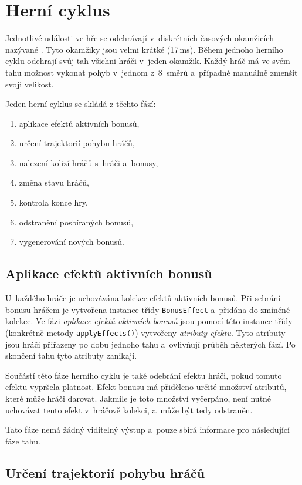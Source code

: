 \section{Herní cyklus}
\label{sec:herni-cyklus}

Jednotlivé události ve hře se odehrávají v~diskrétních časových okamžicích nazývané . Tyto okamžiky jsou velmi krátké (17\,ms). Během jednoho herního cyklu odehrají svůj tah všichni hráči v~jeden okamžik. Každý hráč má ve svém tahu možnost vykonat pohyb v~jednom z~8~směrů a~případně manuálně zmenšit svoji velikost.

Jeden herní cyklus se skládá z těchto fází:
\begin{enumerate}
    \item aplikace efektů aktivních bonusů,
    \item určení trajektorií pohybu hráčů,
    \item nalezení kolizí hráčů s~hráči a~bonusy,
    \item změna stavu hráčů,
    \item kontrola konce hry,
    \item odstranění posbíraných bonusů,
    \item vygenerování nových bonusů.
\end{enumerate}

\subsection*{Aplikace efektů aktivních bonusů}

U~každého hráče je uchovávána kolekce efektů aktivních bonusů. Při sebrání bonusu hráčem je vytvořena instance třídy \texttt{BonusEffect} a~přidána do zmíněné kolekce. Ve fázi \emph{aplikace efektů aktivních bonusů} jsou pomocí této instance třídy (konkrétně metody \texttt{applyEffects()}) vytvořeny \emph{atributy efektu}. Tyto atributy jsou hráči přiřazeny po dobu jednoho tahu a~ovlivňují průběh některých fází. Po skončení tahu tyto atributy zanikají.

Součástí této fáze herního cyklu je také odebrání efektu hráči, pokud tomuto efektu vypršela platnost. Efekt bonusu má přiděleno určité množství atributů, které může hráči darovat. Jakmile je toto množství vyčerpáno, není nutné uchovávat tento efekt v~hráčově kolekci, a~může být tedy odstraněn.

Tato fáze nemá žádný viditelný výstup a~pouze sbírá informace pro následující fáze tahu.

\subsection*{Určení trajektorií pohybu hráčů}

